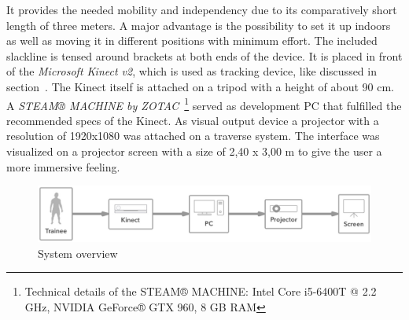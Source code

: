 It provides the needed mobility and independency due to its comparatively short length of three meters.
A major advantage is the possibility to set it up indoors as well as moving it in different positions with minimum effort.
The included slackline is tensed around brackets at both ends of the device.
It is placed in front of the \textit{Microsoft Kinect v2}, which is used as tracking device, like discussed in section~\textit{}.
The Kinect itself is attached on a tripod with a height of about 90 cm.
A \textit{STEAM® MACHINE by ZOTAC}~\footnote{Technical details of the STEAM® MACHINE: Intel Core i5-6400T @ 2.2 GHz, NVIDIA GeForce® GTX 960, 8 GB RAM} served as development PC that fulfilled the recommended specs of the Kinect.
As visual output device a projector with a resolution of 1920x1080 was attached on a traverse system.
The interface was visualized on a projector screen with a size of 2,40 x 3,00 m to give the user a more immersive feeling.

\begin{figure}[htb]
	\centering
	\begin{minipage}[t]{1\linewidth}
		\centering
		\includegraphics[width=1\linewidth]{Pictures/5_3_systemArchitecture}
		\caption{System overview }
		\label{fig:5_3_systemArchitecture}
	\end{minipage}
\end{figure}

